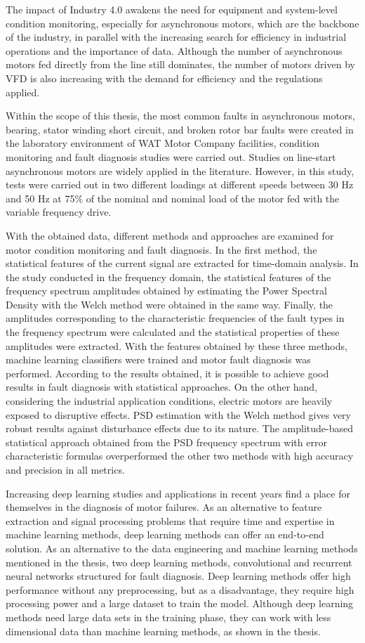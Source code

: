 The impact of Industry 4.0 awakens the need for equipment and system-level condition monitoring, especially for asynchronous motors, which are the backbone of the industry, in parallel with the increasing search for efficiency in industrial operations and the importance of data. Although the number of asynchronous motors fed directly from the line still dominates, the number of motors driven by VFD is also increasing with the demand for efficiency and the regulations applied.

Within the scope of this thesis, the most common faults in asynchronous motors, bearing, stator winding short circuit, and broken rotor bar faults were created in the laboratory environment of WAT Motor Company facilities, condition monitoring and fault diagnosis studies were carried out. Studies on line-start asynchronous motors are widely applied in the literature. However, in this study, tests were carried out in two different loadings at different speeds between 30 Hz and 50 Hz at 75\% of the nominal and nominal load of the motor fed with the variable frequency drive.

With the obtained data, different methods and approaches are examined for motor condition monitoring and fault diagnosis. In the first method, the statistical features of the current signal are extracted for time-domain analysis. In the study conducted in the frequency domain, the statistical features of the frequency spectrum amplitudes obtained by estimating the Power Spectral Density with the Welch method were obtained in the same way. Finally, the amplitudes corresponding to the characteristic frequencies of the fault types in the frequency spectrum were calculated and the statistical properties of these amplitudes were extracted. With the features obtained by these three methods, machine learning classifiers were trained and motor fault diagnosis was performed. According to the results obtained, it is possible to achieve good results in fault diagnosis with statistical approaches. On the other hand, considering the industrial application conditions, electric motors are heavily exposed to disruptive effects. PSD estimation with the Welch method gives very robust results against disturbance effects due to its nature. The amplitude-based statistical approach obtained from the PSD frequency spectrum with error characteristic formulas overperformed the other two methods with high accuracy and precision in all metrics.

Increasing deep learning studies and applications in recent years find a place for themselves in the diagnosis of motor failures. As an alternative to feature extraction and signal processing problems that require time and expertise in machine learning methods, deep learning methods can offer an end-to-end solution. As an alternative to the data engineering and machine learning methods mentioned in the thesis, two deep learning methods, convolutional and recurrent neural networks structured for fault diagnosis. Deep learning methods offer high performance without any preprocessing, but as a disadvantage, they require high processing power and a large dataset to train the model. Although deep learning methods need large data sets in the training phase, they can work with less dimensional data than machine learning methods, as shown in the thesis.